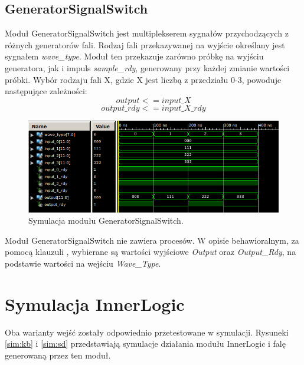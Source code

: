 \documentclass[a4paper,12pt]{article}
\begin{document}
\subsection{GeneratorSignalSwitch}

Moduł GeneratorSignalSwitch jest multiplekserem sygnałów przychodzących z różnych generatorów fali. Rodzaj fali przekazywanej na wyjście określany jest sygnałem \textit{wave\_type}. Moduł ten przekazuje zarówno próbkę na wyjściu generatora, jak i impuls \textit{sample\_rdy}, generowany przy każdej zmianie wartości próbki. Wybór rodzaju fali X, gdzie X jest liczbą z przedziału 0-3, powoduje następujące zależności:
\[output <= input\_X\]
\[output\_rdy <= input\_X\_rdy\]

\begin{figure}[h]
  \centering
  \includegraphics[decodearray={1 0 1 0 1 0}, width=\linewidth]{images/generator_signal_switch.png}
  \caption{Symulacja modułu GeneratorSignalSwitch.}
  \label{sim:gen_signal_switch}
\end{figure}

Moduł GeneratorSignalSwitch nie zawiera procesów. W opisie behawioralnym, za pomocą klauzuli , wybierane są wartości wyjściowe \textit{Output} oraz \textit{Output\_Rdy}, na podstawie wartości na wejściu \textit{Wave\_Type}.

\section{Symulacja InnerLogic}
Oba warianty wejść zostały odpowiednio przetestowane w symulacji. Rysuneki \ref{sim:kb} i \ref{sim:sd} przedstawiają symulacje działania modułu InnerLogic i falę generowaną przez ten moduł.
\end{document}
